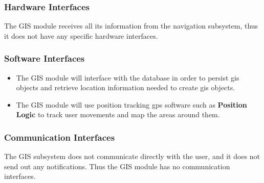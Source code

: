 \subsubsection{Hardware Interfaces}
The GIS module receives all its information from the navigation subsystem, thus it does not have any specific hardware interfaces.
\subsubsection{Software Interfaces}
\begin{itemize}
\item The GIS module will interface with the database in order to persist gis objects and retrieve location information needed to create gis objects.

\item The GIS module will use position tracking gps software such as \textbf{Position Logic} to track user movements and map the areas around them.
\end{itemize}

\subsubsection{Communication Interfaces}
The GIS subsystem does not communicate directly with the user, and it does not send out any notifications. Thus the GIS module has no communication interfaces.

